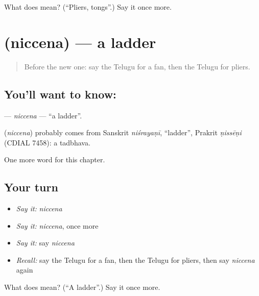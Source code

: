 \begin{tcolorbox}[breakable,colback=teal!4,colframe=teal!35!black,title={Before you move on}]
What does  mean? (\textquotedblleft{}Pliers, tongs\textquotedblright{}.) Say it once more.
\end{tcolorbox}
\section[\texorpdfstring{\te{నిచ్చెన} (niccena)}{నిచ్చెన (niccena)}]{ (niccena) — a ladder}

\label{lesson:TE-C231-niccena}



\begin{quote}
Before the new one: say the Telugu for a fan, then the Telugu for pliers.
\end{quote}

\subsection*{You'll want to know: }
\textbf{} — \emph{niccena} — \textquotedblleft{}a ladder\textquotedblright{}.

\begin{cousinweb}
\textbf{} (\emph{niccena}) probably comes from Sanskrit \emph{niśrayaṇī}, \textquotedblleft{}ladder\textquotedblright{}, Prakrit \emph{ṇissēṇi} (CDIAL 7458): a tadbhava.
\end{cousinweb}

\begin{grammarlens}[title={What you've built}]
One more word for this chapter.
\end{grammarlens}

\subsection*{Your turn}
\begin{itemize}
\raggedright
  \item \emph{Say it:} \emph{niccena}
  \item \emph{Say it:} \emph{niccena}, once more
  \item \emph{Say it:} say \emph{niccena}
  \item \emph{Recall:} say the Telugu for a fan, then the Telugu for pliers, then say \emph{niccena} again
\end{itemize}

\begin{tcolorbox}[breakable,colback=teal!4,colframe=teal!35!black,title={Before you move on}]
What does  mean? (\textquotedblleft{}A ladder\textquotedblright{}.) Say it once more.
\end{tcolorbox}
